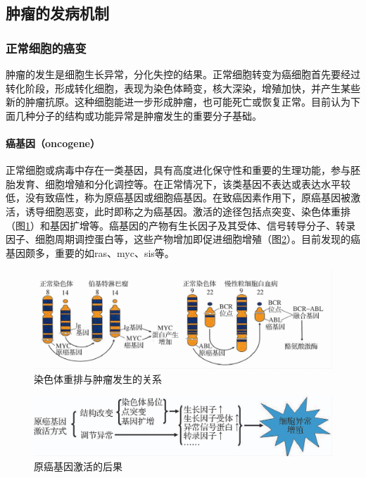 \subsection{肿瘤的发病机制}

\subsubsection{正常细胞的癌变}

肿瘤的发生是细胞生长异常，分化失控的结果。正常细胞转变为癌细胞首先要经过转化阶段，形成转化细胞，表现为染色体畸变，核大深染，增殖加快，并产生某些新的肿瘤抗原。这种细胞能进一步形成肿瘤，也可能死亡或恢复正常。目前认为下面几种分子的结构或功能异常是肿瘤发生的重要分子基础。

\paragraph{癌基因（oncogene）}
正常细胞或病毒中存在一类基因，具有高度进化保守性和重要的生理功能，参与胚胎发育、细胞增殖和分化调控等。在正常情况下，该类基因不表达或表达水平较低，没有致癌性，称为原癌基因或细胞癌基因。在致癌因素作用下，原癌基因被激活，诱导细胞恶变，此时即称之为癌基因。激活的途径包括点突变、染色体重排（图\ref{fig5-20}）和基因扩增等。癌基因的产物有生长因子及其受体、信号转导分子、转录因子、细胞周期调控蛋白等，这些产物增加即促进细胞增殖（图\ref{fig5-21}）。目前发现的癌基因颇多，重要的如ras、myc、sis等。

\begin{figure}[!htbp]
  \centering
  \includegraphics[scale=1.2]{./images/Image00089.jpg}
  \caption{染色体重排与肿瘤发生的关系}
  \label{fig5-20}
\end{figure}

\begin{figure}[!htbp]
  \centering
  \includegraphics{./images/Image00090.jpg}
  \caption{原癌基因激活的后果}
  \label{fig5-21}
\end{figure}

